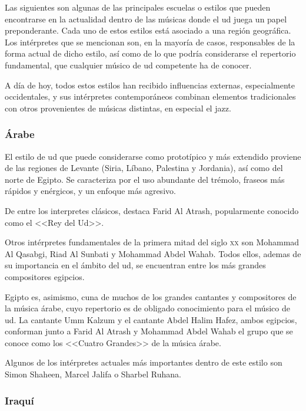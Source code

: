 Las siguientes son algunas de las principales escuelas o estilos que pueden encontrarse en la actualidad dentro de las músicas donde el ud juega un papel preponderante. Cada uno de estos estilos está asociado a una región geográfica. Los intérpretes que se mencionan son, en la mayoría de casos, responsables de la forma actual de dicho estilo, así como de lo que podría considerarse el repertorio fundamental, que cualquier músico de ud competente ha de conocer.

A día de hoy, todos estos estilos han recibido influencias externas, especialmente occidentales, y sus intérpretes contemporáneos combinan elementos tradicionales con otros provenientes de músicas distintas, en especial el jazz.


\subsubsection{Árabe}

El estilo de ud que puede considerarse como prototípico y más extendido proviene de las regiones de Levante (Siria, Líbano, Palestina y Jordania), así como del norte de Egipto. Se caracteriza por el uso abundante del trémolo, fraseos más rápidos y enérgicos, y un enfoque más agresivo.

De entre los interpretes clásicos, destaca Farid Al Atrash, popularmente conocido como el <<Rey del Ud>>.

Otros intérpretes fundamentales de la primera mitad del siglo \textsc{xx} son Mohammad Al Qasabgi, Riad Al Sunbati y Mohammad Abdel Wahab. Todos ellos, ademas de su importancia en el ámbito del ud, se encuentran entre los más grandes compositores egipcios.

Egipto es, asimismo, cuna de muchos de los grandes cantantes y compositores de la música árabe, cuyo repertorio es de obligado conocimiento para el músico de ud. La cantante Umm Kalzum y el cantante Abdel Halim Hafez, ambos egipcios, conforman junto a Farid Al Atrash y Mohammad Abdel Wahab el grupo que se conoce como los <<Cuatro Grandes>> de la música árabe.

Algunos de los intérpretes actuales más importantes dentro de este estilo son Simon Shaheen, Marcel Jalifa o Sharbel Ruhana.


\subsubsection{Iraquí}


